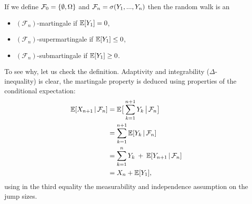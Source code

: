 \begin{example}
		
			If we define $\mathcal{F}_0 = \lbrace \emptyset,\Omega \rbrace$ and $\mathcal{F}_n = \sigma(Y_1,...,Y_n)$ then the random walk is an
			\begin{itemize}
				\item
					$(\mathcal F_n)$-martingale if $\mathbb{E}[Y_1]=0$,
				\item
					$(\mathcal F_n)$-supermartingale if $\mathbb{E}[Y_1] \leq 0$,
				\item
					$(\mathcal F_n)$-submartingale if $\mathbb{E}[Y_1] \geq 0$.
			\end{itemize}
			To see why, let us check the definition. Adaptivity and integrability ($\Delta$-inequality) is clear, the martingale property is deduced using properties of the conditional expectation:
			\begin{align*}
				\E[X_{n+1}\,|\,\cF_n] &= \E \big[ \sum\limits_{k=1}^{n+1}Y_k \,\big|\,\cF_n\big]\\
											&= \sum\limits_{k=1}^{n+1} \E[Y_k\,|\,\cF_n] \\
											&= \sum\limits_{k=1}^{n}Y_k \: + \: \E[Y_{n+1}\,|\,\cF_n]\\%
											&= X_n + \E[Y_1],
			\end{align*}
			using in the third equality the measurability and independence assumption on the jump sizes.
\end{example}
